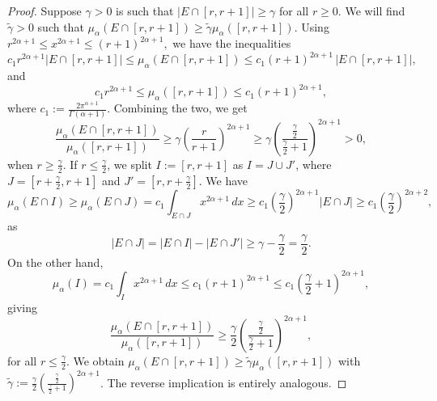 \documentclass[10pt,a4paper]{amsart}
\renewcommand{\ge}{\geqslant}
\renewcommand{\le}{\leqslant}
\begin{document}
\begin{proof}
    Suppose $\gamma > 0$ is such that $|E \cap [r, r+1]| \ge \gamma$ for all $r \ge 0$. We will find $\widetilde{\gamma} > 0$ such that $\mu_\alpha(E \cap [r,r+1]) \ge \widetilde{\gamma} \mu_\alpha([r,r+1])$. Using $r^{2\alpha + 1} \le x^{2\alpha + 1} \le (r+1)^{2\alpha + 1},$ we have the inequalities
    $$c_1 r^{2\alpha + 1} |E \cap [r,r+1]| \le \mu_\alpha(E \cap [r,r+1]) \le c_1 (r+1)^{2\alpha + 1}\, |E \cap [r,r+1]|,$$
    and $$c_1 r^{2\alpha + 1} \le \mu_\alpha([r,r+1]) \le c_1 (r+1)^{2\alpha + 1},$$
    where $c_1 := \frac{2\pi^{\alpha + 1}}{\Gamma(\alpha + 1)}$. Combining the two, we get
    $$\frac{\mu_\alpha(E \cap [r,r+1])}{\mu_\alpha([r,r+1])} \ge \gamma \left(\frac{r}{r+1}\right)^{2\alpha + 1}  \ge \gamma \left(\frac{\frac{\gamma}{2}}{\frac{\gamma}{2}+1}\right)^{2\alpha + 1} > 0,$$
    when $r \ge \frac{\gamma}{2}$. If $r \le \frac{\gamma}{2}$, we split $I := [r,r+1]$ as $I = J \cup J'$, where $J = [r + \frac{\gamma}{2}, r + 1]$ and $J' = [r, r+ \frac{\gamma}{2}]$. We have $$\mu_\alpha(E \cap I) \ge \mu_\alpha(E \cap J) = c_1\int_{E \cap J} x^{2\alpha + 1}\, dx \ge c_1 \left(\frac{\gamma}{2} \right)^{2\alpha + 1} |E \cap J| \ge c_1 \left(\frac{\gamma}{2} \right)^{2\alpha + 2},$$
    as
    $$|E \cap J| = |E \cap I| - |E \cap J'| \ge \gamma - \frac{\gamma}{2} = \frac{\gamma}{2}.$$
    On the other hand, $$\mu_\alpha(I) = c_1\int_I x^{2\alpha + 1}\, dx \le c_1 (r+1)^{2\alpha + 1} \le c_1 \left(\frac{\gamma}{2} + 1 \right)^{2\alpha + 1},$$
    giving 
    $$\frac{\mu_\alpha(E \cap [r,r+1])}{\mu_\alpha([r,r+1])} \ge \frac{\gamma}{2} \left(\frac{\frac{\gamma}{2}}{\frac{\gamma}{2}+1}\right)^{2\alpha + 1},$$
    for all $r \le \frac{\gamma}{2}$. We obtain $\mu_\alpha(E \cap [r,r+1]) \ge \widetilde{\gamma} \mu_\alpha([r,r+1])$ with $\widetilde{\gamma} := \frac{\gamma}{2} \left(\frac{\frac{\gamma}{2}}{\frac{\gamma}{2}+1}\right)^{2\alpha + 1}$. The reverse implication is entirely analogous.
\end{proof}
\end{document}
